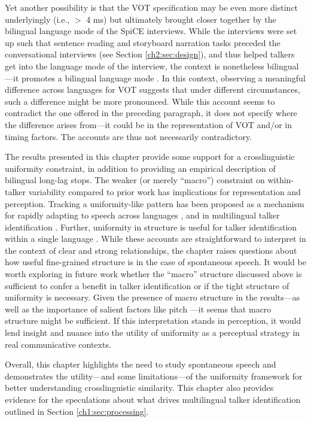 Yet another possibility is that the VOT specification may be even more distinct underlyingly (i.e., $>$ 4 ms) but ultimately brought closer together by the bilingual language mode of the SpiCE interviews. While the interviews were set up such that sentence reading and storyboard narration tasks preceded the conversational interviews (see Section \ref{ch2:sec:design}), and thus helped talkers get into the language mode of the interview, the context is nonetheless bilingual---it promotes a bilingual language mode \citep[see][]{grosjean_2011_transfer}. In this context, observing a meaningful difference across languages for VOT suggests that under different circumstances, such a difference might be more pronounced. While this account seems to contradict the one offered in the preceding paragraph, it does not specify where the difference arises from---it could be in the representation of VOT and/or in timing factors. The accounts are thus not necessarily contradictory.

The results presented in this chapter provide some support for a crosslinguistic uniformity constraint, in addition to providing an empirical description of bilingual long-lag stops. The weaker (or merely ``macro'') constraint on within-talker variability compared to prior work has implications for representation and perception. Tracking a uniformity-like pattern has been proposed as a mechanism for rapidly adapting to speech across languages \citep{reinisch_2013_retune}, and in multilingual talker identification \citep{orena_2019_identifying}. Further, uniformity in structure is useful for talker identification within a single language \citep{ganugapati_2019_structured}. While these accounts are straightforward to interpret in the context of clear and strong relationships, the chapter raises questions about how useful fine-grained structure is in the case of spontaneous speech. It would be worth exploring in future work whether the ``macro'' structure discussed above is sufficient to confer a benefit in talker identification or if the tight structure of uniformity is necessary. Given the presence of macro structure in the results---as well as the importance of salient factors like pitch \citep[over more subtle factors;][]{perrachione_2019_judgments}---it seems that macro structure might be sufficient. If this interpretation stands in perception, it would lend insight and nuance into the utility of uniformity as a perceptual strategy in real communicative contexts. 

Overall, this chapter highlights the need to study spontaneous speech and demonstrates the utility---and some limitations---of the uniformity framework for better understanding crosslinguistic similarity. This chapter also provides evidence for the speculations about what drives multilingual talker identification \citep{orena_2019_identifying} outlined in Section \ref{ch1:sec:processing}.

\endinput 